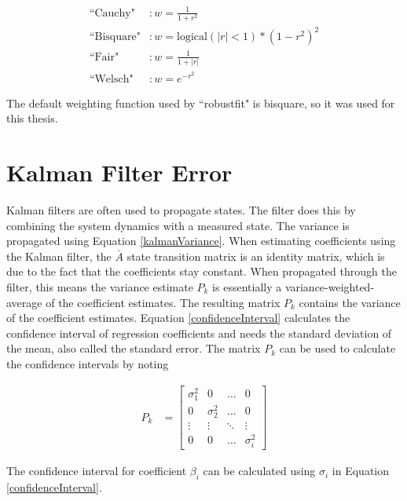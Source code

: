 \begin{align}
\text{``Cauchy"} &: w = \frac{1}{1+r^2}\\
\text{``Bisquare"} &: w = \text{logical}(|r|<1)*(1-r^2)^2\\
\text{``Fair"} &: w =\frac{1}{1+|r|}\\
\text{``Welsch"} &: w = e^{-r^2}
\end{align}

The default weighting function used by ``robustfit" is bisquare, so it was used for this thesis.

\section{Kalman Filter Error}
Kalman filters are often used to propagate states. The filter does this by combining the system dynamics with a measured state. The variance is propagated using Equation \ref{kalmanVariance}. When estimating coefficients using the Kalman filter, the $\bar{A}$ state transition matrix is an identity matrix, which is due to the fact that the coefficients stay constant. When propagated through the filter, this means the variance estimate $P_k$ is essentially a variance-weighted-average of the coefficient estimates. The resulting matrix $P_k$ contains the variance of the coefficient estimates. Equation \ref{confidenceInterval} calculates the confidence interval of regression coefficients and needs the standard deviation of the mean, also called the standard error. The matrix $P_k$ can be used  to calculate the confidence intervals by noting

\begin{align}
P_k &= \begin{bmatrix}
\sigma_{1}^2 &  0  & \ldots & 0\\
0  &  \sigma_{2}^2 & \ldots & 0\\
\vdots & \vdots & \ddots & \vdots\\
0  &   0       &\ldots & \sigma_i^2
\end{bmatrix}
\end{align}

The confidence interval for coefficient $\beta_i$ can be calculated using $\sigma_i$ in Equation \ref{confidenceInterval}.
